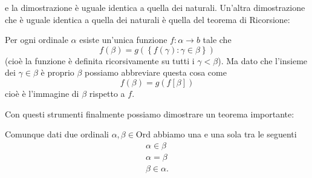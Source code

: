 \documentclass[11pt]{scrartcl}
\begin{document}
 	e la dimostrazione è uguale identica a quella dei naturali. Un'altra dimostrazione che è uguale identica a quella dei naturali è quella del teorema di Ricorsione:
 	\begin{theorem}
 		Per ogni ordinale $\alpha$ esiste un'unica funzione $f:\alpha\to b$ tale che
 		$$f(\beta)=g\left(\left\{f(\gamma):\gamma\in \beta\right\}\right)$$
 		(cioè la funzione è definita ricorsivamente su tutti i $\gamma< \beta$). Ma dato che l'insieme dei $\gamma\in \beta$ è proprio $\beta$ possiamo abbreviare questa cosa come
 		$$f(\beta)=g\left(f\left[\beta\right]\right)$$
 		cioè è l'immagine di $\beta$ rispetto a $f$.
 	\end{theorem}
 	Con questi strumenti finalmente possiamo dimostrare un teorema importante:
 	\begin{theorem}
 		Comunque dati due ordinali $\alpha,\beta\in\text{Ord}$ abbiamo una e una sola tra le seguenti
 		\begin{gather*}
 			\alpha\in \beta \\
 			\alpha=\beta \\
 			\beta\in \alpha.
 		\end{gather*}
 	\end{theorem}
\end{document}

